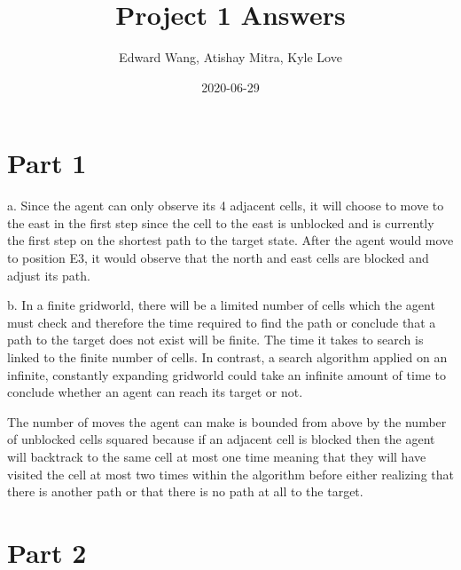 \documentclass{article}
\title{Project 1 Answers}
\date{2020-06-29}
\author{Edward Wang, Atishay Mitra, Kyle Love}
\begin{document}
\maketitle

\section{Part 1}
a. Since the agent can only observe its 4 adjacent cells, it will choose to move to the east in the first step since the cell to the east is unblocked and is currently the first step on the shortest path to the target state. After the agent would move to position E3, it would observe that the north and east cells are blocked and adjust its path. 

b. In a finite gridworld, there will be a limited number of cells which the agent must check and therefore the time required to find the path or conclude that a path to the target does not exist will be finite. The time it takes to search is linked to the finite number of cells. In contrast, a search algorithm applied on an infinite, constantly expanding gridworld could take an infinite amount of time to conclude whether an agent can reach its target or not.

The number of moves the agent can make is bounded from above by the number of unblocked cells squared because if an adjacent cell is blocked then the agent will backtrack to the same cell at most one time meaning that they will have visited the cell at most two times within the algorithm before either realizing that there is another path or that there is no path at all to the target. 

\section{Part 2}
\end{document}
